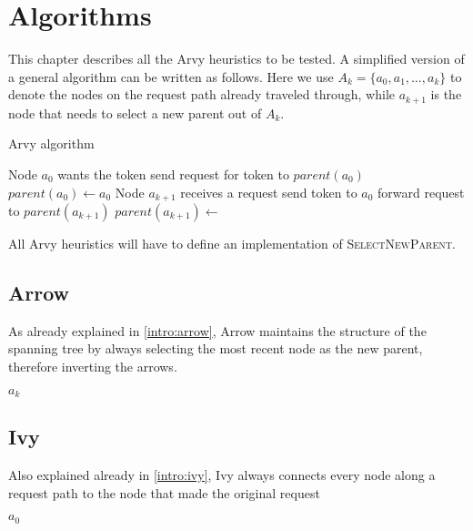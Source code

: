 \documentclass[a4paper, oneside]{discothesis}
\begin{document}
\chapter{Algorithms}\label{algs}

This chapter describes all the Arvy heuristics to be tested. A simplified version of a general algorithm can be written as follows. Here we use $A_k=\{a_0,a_1,\dots,a_k\}$ to denote the nodes on the request path already traveled through, while $a_{k+1}$ is the node that needs to select a new parent out of $A_k$.

\begin{algorithm}
\caption{Arvy algorithm}
\label{arvyalg}
\begin{algorithmic}
\Comment Node $a_{0}$ wants the token
    \State send request for token to $parent(a_{0})$
    \State $parent(a_{0})\gets a_{0}$
\EndIf
\EndFunction
{}
\Comment Node $a_{k+1}$ receives a request
    \State send token to $a_{0}$
\Else
    \State forward request to $parent(a_{k+1})$
\EndIf
\State $parent(a_{k+1})\gets\;$
\EndFunction
\end{algorithmic}
\end{algorithm}

All Arvy heuristics will have to define an implementation of \textsc{SelectNewParent}.

\section{Arrow}

As already explained in \autoref{intro:arrow}, Arrow maintains the structure of the spanning tree by always selecting the most recent node as the new parent, therefore inverting the arrows.

\newpage
\begin{algorithmic}
\State\Return $a_k$
\EndFunction
\end{algorithmic}

\section{Ivy}

Also explained already in \autoref{intro:ivy}, Ivy always connects every node along a request path to the node that made the original request
\begin{algorithmic}
\State\Return $a_0$
\EndFunction
\end{algorithmic}
\end{document}

